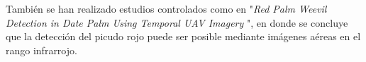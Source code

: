 

También se han realizado estudios controlados como en "\textit{Red Palm Weevil Detection in Date Palm Using Temporal UAV Imagery} \citep{delalieux_red_2023}", en donde se concluye que la detección del picudo rojo puede ser posible mediante imágenes aéreas en el rango infrarrojo.

